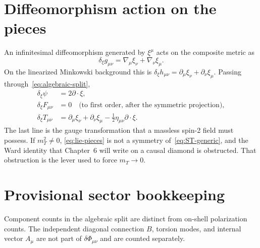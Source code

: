 \section{Diffeomorphism action on the pieces}
\label{sec:ch5-diffs}

An infinitesimal diffeomorphism generated by \(\xi^\mu\) acts on the
composite metric as
\begin{equation}
  \label{eq:lie-g}
  \delta_\xi g_{\mu\nu}
  =\nabla_\mu\xi_\nu+\nabla_\nu\xi_\mu.
\end{equation}
On the linearized Minkowski background this is
\(\delta_\xi h_{\mu\nu}=\partial_\mu\xi_\nu+\partial_\nu\xi_\mu\).
Passing through~\eqref{eq:algebraic-split},
\begin{equation}
  \label{eq:lie-pieces}
  \begin{aligned}
    \delta_\xi\psi
    &=2\partial\cdot\xi,\\
    \delta_\xi F_{\mu\nu}
    &=0
     \quad\text{(to first order, after the symmetric projection)},\\
    \delta_\xi T_{\mu\nu}
    &=\partial_\mu\xi_\nu+\partial_\nu\xi_\mu
      -\tfrac12\eta_{\mu\nu}\partial\cdot\xi.
  \end{aligned}
\end{equation}
The last line is the gauge transformation that a massless spin-2
field must possess. If \(m_T^2\neq 0\), \eqref{eq:lie-pieces} is not
a symmetry of~\eqref{eq:ST-generic}, and the Ward identity that
Chapter~6 will write on a causal diamond is obstructed. That
obstruction is the lever used to force \(m_T\to 0\).

\section{Provisional sector bookkeeping}
\label{sec:ch5-count}

Component counts in the algebraic split are distinct from on-shell
polarization counts. The independent diagonal connection \(B\),
torsion modes, and internal vector \(A_\mu\) are not part of
\(\delta\Phi_{\mu\nu}\) and are counted separately.

